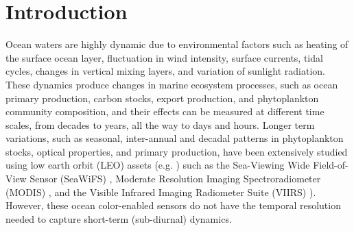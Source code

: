 \documentclass[remotesensing,article,submit,moreauthors,pdftex,10pt,a4paper]{Definitions/mdpi}
\begin{document}


\section{Introduction}




Ocean waters are highly dynamic due to environmental factors such as heating of the surface ocean layer, fluctuation in wind intensity, surface currents, tidal cycles, changes in vertical mixing layers, and variation of sunlight radiation. These dynamics produce changes in marine ecosystem processes, such as ocean primary production, carbon stocks, export production, and phytoplankton community composition, and their effects can be measured at different time scales, from decades to years, all the way to days and hours. Longer term variations, such as seasonal, inter-annual and decadal patterns in phytoplankton stocks, optical properties, and primary production, have been extensively studied using low earth orbit (LEO) assets (e.g. \cite{McClain2009,Lee_2010,Behrenfeld2016,Melin2016}) such as the Sea-Viewing Wide Field-of-View Sensor (SeaWiFS) \cite{Hooker_1992}, Moderate Resolution Imaging Spectroradiometer (MODIS) \cite{Esaias1998}, and the Visible Infrared Imaging Radiometer Suite (VIIRS) \cite{Goldberg_2013}). However, these ocean color-enabled sensors do not have the temporal resolution needed to capture short-term (sub-diurnal) dynamics.

\end{document}
